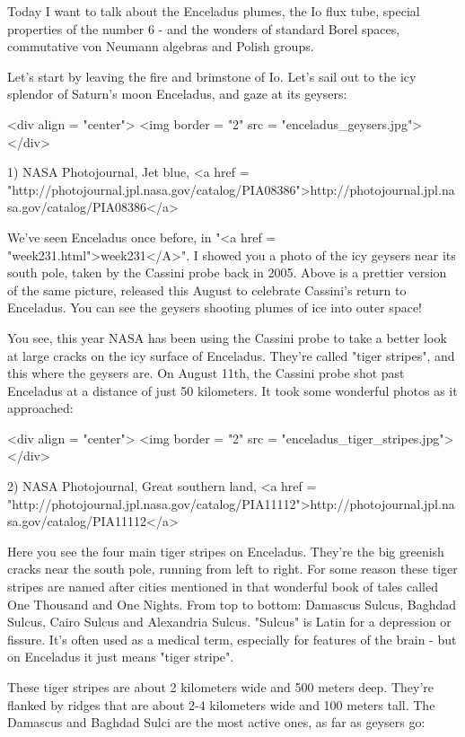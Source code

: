 


Today I want to talk about the Enceladus plumes, the Io flux tube,
special properties of the number 6 - and the wonders of standard Borel
spaces, commutative von Neumann algebras and Polish groups.

Let's start by leaving the fire and brimstone of Io.  Let's sail
out to the icy splendor of Saturn's moon Enceladus, and gaze at its
geysers:

<div align = "center">
<img border = "2" src = "enceladus_geysers.jpg">
</div>

1) NASA Photojournal, Jet blue,
<a href = "http://photojournal.jpl.nasa.gov/catalog/PIA08386">http://photojournal.jpl.nasa.gov/catalog/PIA08386</a>

We've seen Enceladus once before, in "<a href =
"week231.html">week231</A>".  I showed you a photo of the icy
geysers near its south pole, taken by the Cassini probe back in 2005.
Above is a prettier version of the same picture, released this August
to celebrate Cassini's return to Enceladus.  You can see the geysers
shooting plumes of ice into outer space!

You see, this year NASA has been using the Cassini probe to take a
better look at large cracks on the icy surface of Enceladus. 
They're called "tiger stripes", and this where the geysers are.  
On August 11th, the Cassini probe shot past Enceladus at a distance of
just 50 kilometers.  It took some wonderful photos as it approached:

<div align = "center">
<img border = "2" src = "enceladus_tiger_stripes.jpg">
</div>

2) NASA Photojournal, Great southern land, 
<a href = "http://photojournal.jpl.nasa.gov/catalog/PIA11112">http://photojournal.jpl.nasa.gov/catalog/PIA11112</a>

Here you see the four main tiger stripes on Enceladus.  They're the
big greenish cracks near the south pole, running from left to right.
For some reason these tiger stripes are named after cities mentioned
in that wonderful book of tales called One Thousand and One Nights.
From top to bottom: Damascus Sulcus, Baghdad Sulcus, Cairo Sulcus and
Alexandria Sulcus.  "Sulcus" is Latin for a depression or
fissure.  It's often used as a medical term, especially for features
of the brain - but on Enceladus it just means "tiger stripe".

These tiger stripes are about 2 kilometers wide and 500 meters deep.
They're flanked by ridges that are about 2-4 kilometers wide and 
100 meters tall.  The Damascus and Baghdad Sulci are the most active
ones, as far as geysers go:

